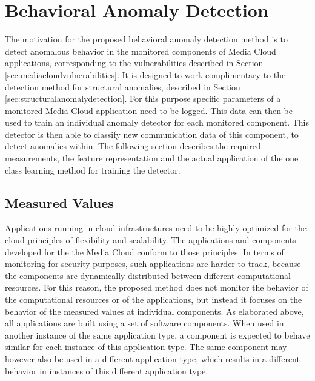 \documentclass{llncs}
\begin{document}
\section{Behavioral Anomaly Detection}
\label{sec:behavioralanomalydetection}

The motivation for the proposed behavioral anomaly detection method is to detect anomalous behavior in the monitored components of Media Cloud applications, corresponding to the vulnerabilities described in Section \ref{sec:mediacloudvulnerabilities}. It is designed to work complimentary to the detection method for structural anomalies, described in Section \ref{sec:structuralanomalydetection}. For this purpose specific parameters of a monitored Media Cloud application need to be logged. This data can then be used to train an individual anomaly detector for each monitored component. This detector is then able to classify new communication data of this component, to detect anomalies within. The following section describes the required measurements, the feature representation and the actual application of the one class learning method for training the detector.

\subsection{Measured Values}
\label{measuredvalues}

Applications running in cloud infrastructures need to be highly optimized for the cloud principles of flexibility and scalability. The applications and components developed for the the Media Cloud conform to those principles. In terms of monitoring for security purposes, such applications are harder to track, because the components are dynamically distributed between different computational resources. For this reason, the proposed method does not monitor the behavior of the computational resources or of the applications, but instead it focuses on the behavior of the measured values at individual components. As elaborated above, all applications are built using a set of software components. When used in another instance of the same application type, a component is expected to behave similar for each instance of this application type. The same component may however also be used in a different application type, which results in a different behavior in instances of this different application type.
\end{document}
